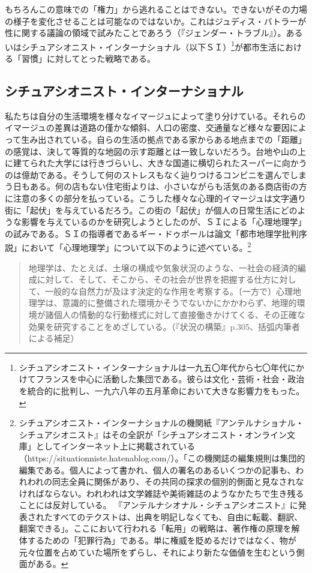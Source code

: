 \documentclass[b5j,twoside,twocolumn]{utarticle}
\begin{document}
もちろんこの意味での「権力」から逃れることはできない。できないがその力場の様子を変化させることは可能なのではないか。これはジュディス・バトラーが性に関する議論の領域で試みたことであろう（『ジェンダー・トラブル』）。あるいはシチュアシオニスト・インターナショナル（以下ＳＩ）\footnote{シチュアシオニスト・インターナショナルは一九五〇年代から七〇年代にかけてフランスを中心に活動した集団である。彼らは文化・芸術・社会・政治を統合的に批判し、一九六八年の五月革命において大きな影響力をもった。}が都市生活における「習慣」に対してとった戦略である。
\subsection{シチュアシオニスト・インターナショナル}
私たちは自分の生活環境を様々なイマージュによって塗り分けている。それらのイマージュの差異は道路の僅かな傾斜、人口の密度、交通量など様々な要因によって生み出されている。自らの生活の拠点である家からある地点までの「距離」の感覚は、決して等質的な地図の示す距離とは一致しないだろう。台地や山の上に建てられた大学には行きづらいし、大きな国道に横切られたスーパーに向かうのは億劫である。そうして何のストレスもなく辿りつけるコンビニを選んでしまう日もある。何の店もない住宅街よりは、小さいながらも活気のある商店街の方に注意の多くの部分を払っている。こうした様々な心理的イマージュは文字通り街に「起伏」を与えているだろう。この街の「起伏」が個人の日常生活にどのような影響を与えているのかを研究しようとしたのが、ＳＩによる「心理地理学」の試みである。ＳＩの指導者であるギー・ドゥボールは論文「都市地理学批判序説」において「心理地理学」について以下のように述べている。\footnote{シチュアシオニスト・インターナショナルの機関紙『アンテルナショナル・シチュアシオニスト』はその全訳が「シチュアシオニスト・オンライン文庫」としてインターネット上に掲載されている（https://situationniste.hatenablog.com/）。「この機関誌の編集規則は集団的編集である。個人によって書かれ、個人の署名のあるいくつかの記事も、われわれの同志全員に関係があり、その共同の探求の個別的側面と見なされなければならない。われわれは文学雑誌や美術雑誌のようなかたちで生き残ることには反対している。 『アンテルナシオナル・シチュアシオニスト』に発表されたすべてのテクストは、出典を明記しなくても、自由に転載、翻訳、翻案できる」。ここにおいて行われる「転用」の戦略は、著作権の原理を解体するための「犯罪行為」である。単に権威を貶めるだけではなく、物が元々位置を占めていた場所をずらし、それにより新たな価値を生むという側面がある。
}
\begin{quote}
地理学は、たとえば、土壌の構成や気象状況のような、一社会の経済的編成に対して、そして、そこから、その社会が世界を把握する仕方に対して、一般的な自然力が及ほす決定的な作用を考察する。〔一方で〕心理地理学は、意識的に整備された環境かそうでないかにかかわらず、地理的環境が諸個人の情動的な行動様式に対して直接働きかけてくる、その正確な効果を研究することをめざしている。（『状況の構築』p.305、括弧内筆者による補足）
\end{quote}
\end{document}
